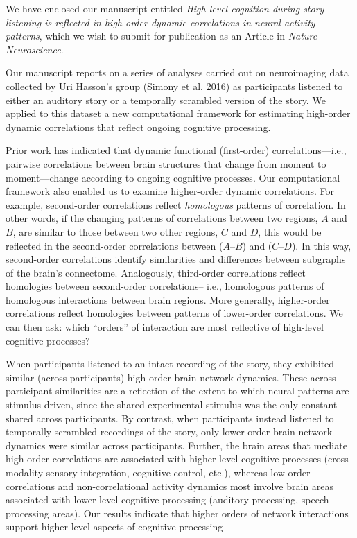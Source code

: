 \documentclass[11pt,stdletter,orderfromtodate,sigleft]{newlfm}
\begin{document}
\begin{newlfm}
  We have enclosed our manuscript entitled \textit{High-level
    cognition during story listening is reflected in high-order
    dynamic correlations in neural activity patterns}, which we wish
  to submit for publication as an Article in \textit{Nature
    Neuroscience}.

  Our manuscript reports on a series of analyses carried out on
  neuroimaging data collected by Uri Hasson's group (Simony et al,
  2016) as participants listened to either an auditory story or a
  temporally scrambled version of the story.  We applied to this
  dataset a new computational framework for estimating high-order
  dynamic correlations that reflect ongoing cognitive processing.

  Prior work has indicated that dynamic functional (first-order)
  correlations---i.e., pairwise correlations between brain structures
  that change from moment to moment---change according to ongoing
  cognitive processes.  Our computational framework also enabled us to
  examine higher-order dynamic correlations.  For example,
  second-order correlations reflect \textit{homologous} patterns of
  correlation.  In other words, if the changing patterns of
  correlations between two regions, $A$ and $B$, are similar to those
  between two other regions, $C$ and $D$, this would be reflected in
  the second-order correlations between ($A$--$B$) and ($C$--$D$).  In
  this way, second-order correlations identify similarities and
  differences between subgraphs of the brain's connectome.
  Analogously, third-order correlations reflect homologies between
  second-order correlations-- i.e., homologous patterns of homologous
  interactions between brain regions.  More generally, higher-order
  correlations reflect homologies between patterns of lower-order
  correlations.  We can then ask: which ``orders'' of interaction are
  most reflective of high-level cognitive processes?

  When participants listened to an intact recording of the story, they
  exhibited similar (across-participants) high-order brain network
  dynamics.  These across-participant similarities are a reflection of
  the extent to which neural patterns are stimulus-driven, since the
  shared experimental stimulus was the only constant shared across
  participants.  By contrast, when participants instead listened to
  temporally scrambled recordings of the story, only lower-order brain
  network dynamics were similar across participants.  Further, the
  brain areas that mediate high-order correlations are associated with
  higher-level cognitive processes (cross-modality sensory
  integration, cognitive control, etc.), whereas low-order
  correlations and non-correlational activity dynamics most involve
  brain areas associated with lower-level cognitive processing
  (auditory processing, speech processing areas).  Our results
  indicate that higher orders of network interactions support
  higher-level aspects of cognitive processing


\end{newlfm}
\end{document}
